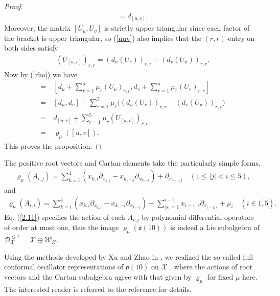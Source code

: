 \documentclass[12pt]{article}
\numberwithin{equation}{section}
\theoremstyle{definition}
\theoremstyle{remark}
\begin{document}
\begin{proof}
\begin{eqnarray}
	    [d_u,d_v]=d_{[u,v]}.
	\end{eqnarray}
	Moreover, the matrix $[U_u,U_v]$ is strictly upper triangular since each factor of the bracket is upper triangular, so (\ref{uuv}) also implies that the $(r,r)$-entry on both sides satisfy
	\begin{eqnarray}
		(U_{[u,v]})_{r,r}=(d_u(U_v))_{r,r}-(d_v(U_u))_{r,r}.
	\end{eqnarray}
	Now by (\ref{rho}) we have
	\begin{align}
		[\varrho_{\mu}(u),\varrho_{\mu}(v)]=&\:[d_u+\sum_{r=1}^{5}\mu_r(U_u)_{r,r},d_v+\sum_{r=1}^{5}\mu_r(U_v)_{r,r}]\nonumber\\
		=&\:[d_u,d_v]+\sum_{r=1}^5\mu_r\big((d_u(U_v))_{r,r}-(d_v(U_u))_{r,r}\big)\nonumber\\
		=&\:d_{[u,v]}+\sum_{r=1}^5\mu_r(U_{[u,v]})_{r,r}\nonumber\\
		=&\:\varrho_{\mu}([u,v]).
	\end{align}
	This proves the proposition.	
\end{proof}
The positive root vectors and Cartan elements take the particularly simple forms,
\begin{eqnarray}
	\varrho_{\mu}(A_{i,j})=\sum_{k=i}^4(x_{k,i}\partial_{x_{k,j}}-x_{k,-j}\partial_{x_{k,-i}})+\partial_{x_{i-1,j}}\quad (1\leqslant |j|<i\leqslant 5), \label{2.24}
\end{eqnarray}
and
\begin{eqnarray}
	\varrho_{\mu}(A_{i,i})=\sum\limits_{k=i}^4(x_{k,i}\partial_{x_{k,i}}-x_{k,-i}\partial_{x_{k,-i}})-\sum\limits_{|s|=1}^{i-1}x_{i-1,s}\partial_{x_{i-1,s}}+\mu_i\quad(i\in\overline{1,5}). \label{2.25}
\end{eqnarray}
Eq. (\ref{2.11}) specifies the action of each $A_{i,j}$ by polynomial differential operators of order at most one, thus the image $\varrho_{\mu}(\mathfrak{o}(10))$ is indeed a Lie subalgebra of $\mathscr{D}_{\mathscr{X}}^{\leqslant 1}=\mathscr{X}\oplus{\mathscr{W}}_{\mathscr{X}}$. 

Using the methods developed by Xu and Zhao in \cite{XuZhao}, we realized the so-called full conformal oscillator representations of $\mathfrak{o}(10)$ on $\mathscr{X}$ \cite[Theorem 2.3]{Zhou}, where the actions of root vectors and the Cartan subalgebra agree with that given by $\varrho_{\mu}$ for fixed $\mu$ here. The interested reader is referred to the reference for details. 
\end{document}
